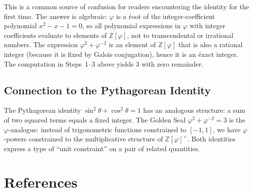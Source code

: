 This is a common source of confusion for readers encountering
the identity for the first time.  The answer is algebraic:
$\varphi$ is a \'root of the integer-coefficient polynomial
$x^2 - x - 1 = 0$, so all polynomial expressions in $\varphi$
with integer coefficients evaluate to elements of
$\mathbb{Z}[\varphi]$, not to transcendental or irrational
numbers.  The expression $\varphi^2 + \varphi^{-2}$ is an
element of $\mathbb{Z}[\varphi]$ that is also a rational
integer (because it is fixed by Galois conjugation), hence it
is an \'exact integer.  The computation in Steps~1--3 above
yields $3$ with zero remainder.

\subsection{Connection to the Pythagorean Identity}

The Pythagorean identity $\sin^2\theta + \cos^2\theta = 1$
has an analogous structure: a sum of two squared terms equals
a fixed integer.  The Golden Seal $\varphi^2 + \varphi^{-2}
= 3$ is the $\varphi$-analogue: instead of trigonometric
functions constrained to $[-1,1]$, we have $\varphi$-powers
constrained to the multiplicative structure of
$\mathbb{Z}[\varphi]^\times$.  Both identities express a
type of ``unit constraint'' on a pair of related quantities.

\section{References}
\label{sec:gs-refs}

